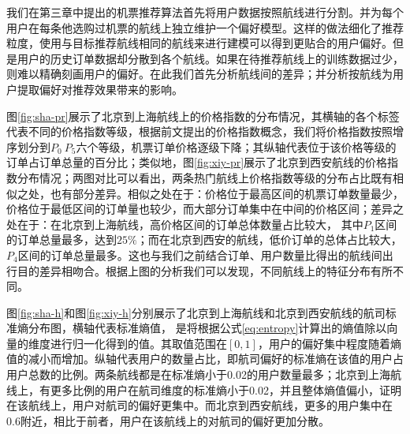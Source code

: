 我们在第三章中提出的机票推荐算法首先将用户数据按照航线进行分割。并为每个用户在每条他选购过机票的航线上独立维护一个偏好模型。这样的做法细化了推荐粒度，使用与目标推荐航线相同的航线来进行建模可以得到更贴合的用户偏好。但是用户的历史订单数据却分散到各个航线。如果在待推荐航线上的训练数据过少，则难以精确刻画用户的偏好。在此我们首先分析航线间的差异；并分析按航线为用户提取偏好对推荐效果带来的影响。

\begin{figure}
\centering
{}
\end{figure}

图\ref{fig:sha-pr}展示了北京到上海航线上的价格指数的分布情况，其横轴的各个标签代表不同的价格指数等级，根据前文提出的价格指数概念，我们将价格指数按照增序划分到$P_0 ~ P_5$六个等级，机票订单价格逐级下降；其纵轴代表位于该价格等级的订单占订单总量的百分比；类似地，图\ref{fig:xiy-pr}展示了北京到西安航线的价格指数分布情况；两图对比可以看出，两条热门航线上价格指数等级的分布占比既有相似之处，也有部分差异。相似之处在于：价格位于最高区间的机票订单数量最少，价格位于最低区间的订单量也较少，而大部分订单集中在中间的价格区间；差异之处在于：在北京到上海航线，高价格区间的订单总体数量占比较大，
其中$P_1$区间的订单总量最多，达到$25\%$；而在北京到西安的航线，低价订单的总体占比较大，
$P_4$区间的订单总量最多。这也与我们之前结合订单、用户数量比得出的航线间出行目的差异相吻合。根据上图的分析我们可以发现，不同航线上的特征分布有所不同。

\begin{figure}
\centering
{}
\end{figure}

图\ref{fig:sha-h}和图\ref{fig:xiy-h}分别展示了北京到上海航线和北京到西安航线的航司标准熵分布图，横轴代表标准熵值，
是将根据公式\ref{eq:entropy}计算出的熵值除以向量的维度进行归一化得到的值。其取值范围在$[0,1]$，用户的偏好集中程度随着熵值的减小而增加。纵轴代表用户的数量占比，即航司偏好的标准熵在该值的用户占用户总数的比例。两条航线都是在标准熵小于0.02的用户数量最多；北京到上海航线上，有更多比例的用户在航司维度的标准熵小于0.02，并且整体熵值偏小，证明在该航线上，用户对航司的偏好更集中。而北京到西安航线，更多的用户集中在0.6附近，相比于前者，用户在该航线上的对航司的偏好更加分散。

